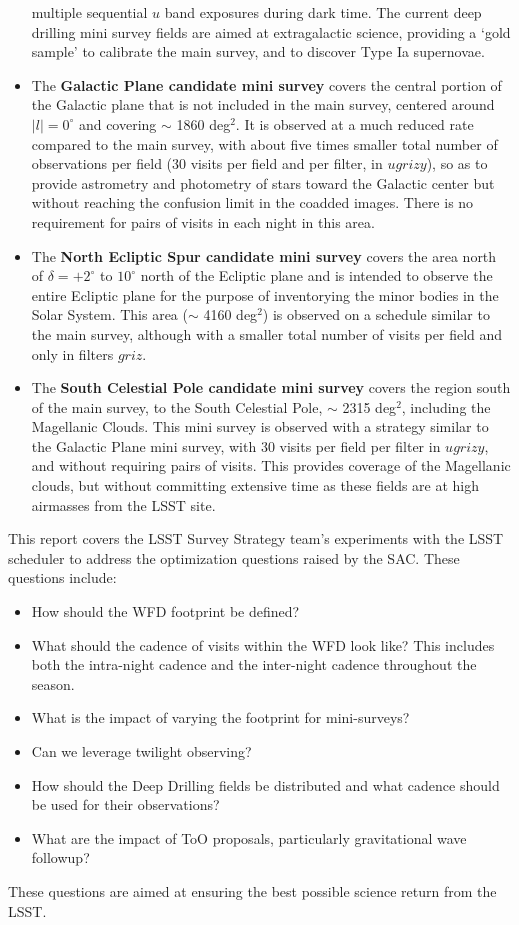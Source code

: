 \begin{itemize}
multiple sequential $u$ band exposures during dark time. The current deep drilling mini survey fields are aimed at extragalactic
science, providing a `gold sample' to calibrate the main survey, and to discover Type Ia supernovae. 
\item The {\bf Galactic Plane candidate mini survey} covers the central portion of the Galactic plane that is not included in the main survey, 
centered around $|l| = 0^\circ$ and covering $\sim$ 1860 deg$^2$.  It is observed at a much reduced rate compared to the main survey, 
with about five times smaller total number of observations per field (30 visits per field and per filter, in $ugrizy$), so as to
provide astrometry and photometry of stars toward the Galactic center but without reaching the confusion limit in the coadded images.
There is no requirement for pairs of visits in each night in this area.
\item The {\bf North Ecliptic Spur candidate mini survey} covers the area north of $\delta = +2^\circ$ to $10^\circ$ north of the Ecliptic plane
and is intended to observe the entire Ecliptic plane for the purpose of inventorying the minor bodies in the Solar System. This area ($\sim$ 4160 deg$^2$) 
is observed on a schedule similar to the main survey, although with a smaller total number of visits per field and only in filters $griz$. 
\item The {\bf South Celestial Pole candidate mini survey} covers the region south of the main survey, to the South Celestial Pole, $\sim$ 2315 deg$^2$,
including the Magellanic Clouds. 
This mini survey is observed with a strategy similar to the Galactic Plane mini survey, with 30 visits per field per filter in $ugrizy$, 
and without requiring pairs of visits. This provides coverage of the Magellanic clouds, but without committing extensive time as these fields are
at high airmasses from the LSST site.
\end{itemize}

This report covers the LSST Survey Strategy team's experiments with the LSST scheduler to address the optimization questions raised by the SAC. These questions include:
\begin{itemize}
\item How should the WFD footprint be defined?
\item What should the cadence of visits within the WFD look like? This includes both the intra-night cadence and the inter-night cadence throughout the season.
\item What is the impact of varying the footprint for mini-surveys?
\item Can we leverage twilight observing?
\item How should the Deep Drilling fields be distributed and what cadence should be used for their observations?
\item What are the impact of ToO proposals, particularly gravitational wave followup?
\end{itemize}

These questions are aimed at ensuring the best possible science return from the LSST. 

